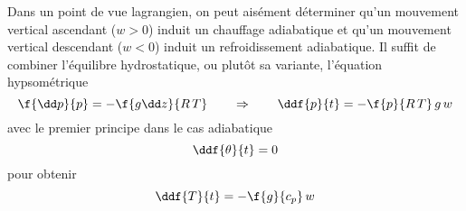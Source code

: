 \sk
Dans un point de vue lagrangien, on peut aisément déterminer
qu'un mouvement vertical ascendant ($w>0$) induit un chauffage adiabatique
et qu'un mouvement vertical descendant ($w<0$) induit un refroidissement adiabatique.
Il suffit de combiner l'équilibre hydrostatique,
ou plutôt sa variante, l'équation hypsométrique
\[ 
\f{\dd p}{p} = -\f{g \dd z}{R\,T} 
\qquad  
\Rightarrow
\qquad
\ddf{p}{t} = - \f{p}{R\,T} \, g \, w
\]
\noindent avec le premier principe dans le cas
adiabatique
\[
\ddf{\theta}{t} = 0
\]
\noindent pour obtenir
\[
\ddf{T}{t} = - \f{g}{c_p} \, w
\]

